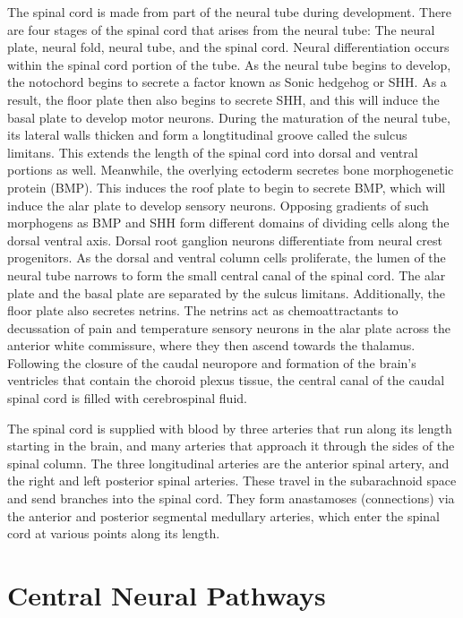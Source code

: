 \documentclass[]{book}
\begin{document}
The spinal cord is made from part of the neural tube during development. There are four stages of the spinal cord that arises from the neural tube: The neural plate, neural fold, neural tube, and the spinal cord. Neural differentiation occurs within the spinal cord portion of the tube. As the neural tube begins to develop, the notochord begins to secrete a factor known as Sonic hedgehog or SHH. As a result, the floor plate then also begins to secrete SHH, and this will induce the basal plate to develop motor neurons. During the maturation of the neural tube, its lateral walls thicken and form a longtitudinal groove called the sulcus limitans. This extends the length of the spinal cord into dorsal and ventral portions as well. Meanwhile, the overlying ectoderm secretes bone morphogenetic protein (BMP). This induces the roof plate to begin to secrete BMP, which will induce the alar plate to develop sensory neurons. Opposing gradients of such morphogens as BMP and SHH form different domains of dividing cells along the dorsal ventral axis. Dorsal root ganglion neurons differentiate from neural crest progenitors. As the dorsal and ventral column cells proliferate, the lumen of the neural tube narrows to form the small central canal of the spinal cord. The alar plate and the basal plate are separated by the sulcus limitans. Additionally, the floor plate also secretes netrins. The netrins act as chemoattractants to decussation of pain and temperature sensory neurons in the alar plate across the anterior white commissure, where they then ascend towards the thalamus. Following the closure of the caudal neuropore and formation of the brain's ventricles that contain the choroid plexus tissue, the central canal of the caudal spinal cord is filled with cerebrospinal fluid.

The spinal cord is supplied with blood by three arteries that run along its length starting in the brain, and many arteries that approach it through the sides of the spinal column. The three longitudinal arteries are the anterior spinal artery, and the right and left posterior spinal arteries. These travel in the subarachnoid space and send branches into the spinal cord. They form anastamoses (connections) via the anterior and posterior segmental medullary arteries, which enter the spinal cord at various points along its length.

\hypertarget{central-neural-pathways}{%
\section{Central Neural Pathways}\label{central-neural-pathways}}
\end{document}
